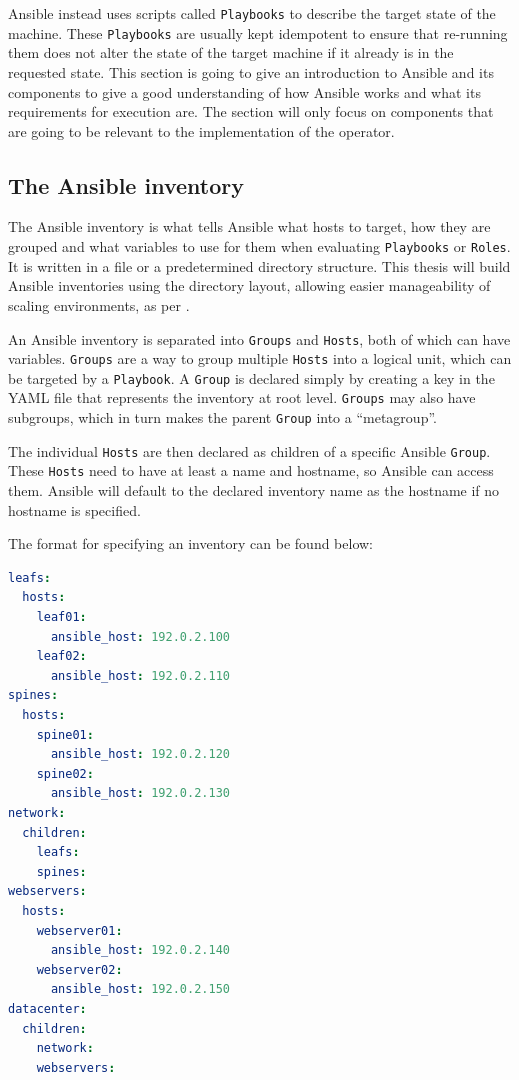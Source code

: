 Ansible instead uses scripts called \texttt{Playbooks} to describe the target state of the machine. These \texttt{Playbooks} are usually kept idempotent to ensure that re-running them does not alter the state of the target machine if it already is in the requested state.
This section is going to give an introduction to Ansible and its components to give a good understanding of how Ansible works and what its requirements for execution are.
The section will only focus on components that are going to be relevant to the implementation of the operator.
\parencite{ansibledocsindex}

\subsection{The Ansible inventory}
The Ansible inventory is what tells Ansible what hosts to target, how they are grouped and what variables to use for them when evaluating \texttt{Playbooks} or \texttt{Roles}.
It is written in a file or a predetermined directory structure.
This thesis will build Ansible inventories using the directory layout, allowing easier manageability of scaling environments, as per \cite{ansibleinventoryintro}.

\clearpage

An Ansible inventory is separated into \texttt{Groups} and \texttt{Hosts}, both of which can have variables.
\texttt{Groups} are a way to group multiple \texttt{Hosts} into a logical unit, which can be targeted by a \texttt{Playbook}.
A \texttt{Group} is declared simply by creating a key in the YAML file that represents the inventory at root level.
\texttt{Groups} may also have subgroups, which in turn makes the parent \texttt{Group} into a \enquote{metagroup}.
\parencite{ansibleinventoryintro}

The individual \texttt{Hosts} are then declared as children of a specific Ansible \texttt{Group}.
These \texttt{Hosts} need to have at least a name and hostname, so Ansible can access them.
Ansible will default to the declared inventory name as the hostname if no hostname is specified.

\clearpage

The format for specifying an inventory can be found below:

\begin{lstlisting}[language=yaml,caption=Example Ansible inventory with \texttt{Groups} and \texttt{Hosts} (source: \cite{ansibleinventoryintro})]
leafs:
  hosts:
    leaf01:
      ansible_host: 192.0.2.100
    leaf02:
      ansible_host: 192.0.2.110
spines:
  hosts:
    spine01:
      ansible_host: 192.0.2.120
    spine02:
      ansible_host: 192.0.2.130
network:
  children:
    leafs:
    spines:
webservers:
  hosts:
    webserver01:
      ansible_host: 192.0.2.140
    webserver02:
      ansible_host: 192.0.2.150
datacenter:
  children:
    network:
    webservers:
\end{lstlisting}

